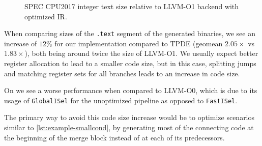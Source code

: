 \begin{figure}[t]
    \caption{SPEC CPU2017 integer text size relative to LLVM-O1 backend with optimized IR.}
    \label{fig:spec_text_size}
\end{figure}

When comparing sizes of the \texttt{.text} segment of the generated binaries, we see an increase of $12\%$ for our implementation compared to TPDE (geomean $2.05\times$ vs $1.83\times$), both being around twice the size of LLVM-O1. We usually expect better register allocation to lead to a smaller code size, but in this case, splitting jumps and matching register sets for all branches leads to an increase in code size. 


On  we see a worse performance when compared to LLVM-O0, which is due to its usage of \texttt{GlobalISel} for the unoptimized pipeline as opposed to \texttt{FastISel}.

The primary way to avoid this code size increase would be to optimize scenarios similar to \autoref{lst:example-smallcond}, by generating most of the connecting code at the beginning of the merge block instead of at each of its predecessors. 

